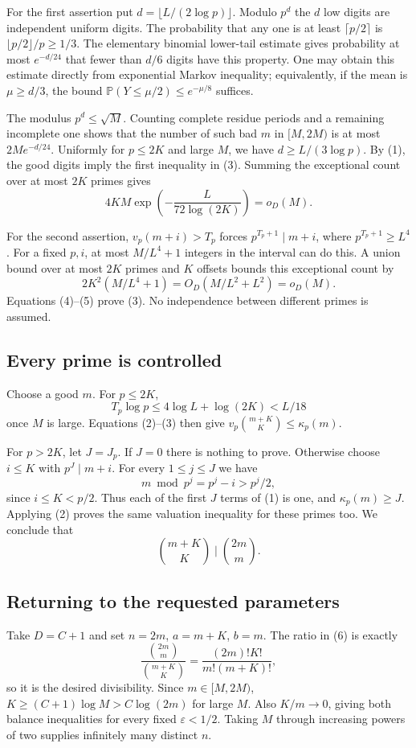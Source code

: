 For the first assertion put $d=\lfloor L/(2\log p)\rfloor$. Modulo $p^d$ the $d$ low digits are independent uniform digits. The probability that any one is at least $\lceil p/2\rceil$ is $\lfloor p/2\rfloor/p\geq1/3$. The elementary binomial lower-tail estimate gives probability at most $e^{-d/24}$ that fewer than $d/6$ digits have this property. One may obtain this estimate directly from exponential Markov inequality; equivalently, if the mean is $\mu\geq d/3$, the bound $\mathbb P(Y\leq\mu/2)\leq e^{-\mu/8}$ suffices.

The modulus $p^d\leq\sqrt M$. Counting complete residue periods and a remaining incomplete one shows that the number of such bad $m$ in $[M,2M)$ is at most $2M e^{-d/24}$. Uniformly for $p\leq2K$ and large $M$, we have $d\geq L/(3\log p)$. By (1), the good digits imply the first inequality in (3). Summing the exceptional count over at most $2K$ primes gives
\[
 4KM\exp\left(-\frac L{72\log(2K)}\right)=o_D(M). \tag{4}
\]

For the second assertion, $v_p(m+i)>T_p$ forces $p^{T_p+1}\mid m+i$, where $p^{T_p+1}\geq L^4$. For a fixed $p,i$, at most $M/L^4+1$ integers in the interval can do this. A union bound over at most $2K$ primes and $K$ offsets bounds this exceptional count by
\[
 2K^2(M/L^4+1)=O_D(M/L^2+L^2)=o_D(M). \tag{5}
\]
Equations (4)--(5) prove (3). No independence between different primes is assumed.

\subsection*{Every prime is controlled}
Choose a good $m$. For $p\leq2K$,
\[
 T_p\log p\leq4\log L+\log(2K)<L/18
\]
once $M$ is large. Equations (2)--(3) then give
$v_p\binom{m+K}{K}\leq\kappa_p(m)$.

For $p>2K$, let $J=J_p$. If $J=0$ there is nothing to prove. Otherwise choose $i\leq K$ with $p^J\mid m+i$. For every $1\leq j\leq J$ we have
\[
 m\bmod p^j=p^j-i>p^j/2,
\]
since $i\leq K<p/2$. Thus each of the first $J$ terms of (1) is one, and $\kappa_p(m)\geq J$. Applying (2) proves the same valuation inequality for these primes too. We conclude that
\[
 \binom{m+K}{K}\mid\binom{2m}{m}. \tag{6}
\]

\subsection*{Returning to the requested parameters}
Take $D=C+1$ and set $n=2m$, $a=m+K$, $b=m$. The ratio in (6) is exactly
\[
 \frac{\binom{2m}{m}}{\binom{m+K}{K}}
   =\frac{(2m)!K!}{m!(m+K)!},
\]
so it is the desired divisibility. Since $m\in[M,2M)$,
$K\geq(C+1)\log M>C\log(2m)$ for large $M$. Also $K/m\to0$, giving both balance inequalities for every fixed $\varepsilon<1/2$. Taking $M$ through increasing powers of two supplies infinitely many distinct $n$.

